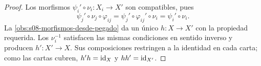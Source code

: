 \begin{center}
\begin{minipage}{.43\textwidth}
\centering
{}
\par{}
\end{minipage}\hfill
\begin{minipage}{.53\textwidth}
\centering
{}
\par{}
\end{minipage}
\end{center}
\begin{proof}
Los morfismos $\psi_i'\circ\nu_i\colon X_i\to X'$ son compatibles, pues
\[
\psi_j'\circ\nu_j\circ\varphi_{ij}
=\psi_j'\circ\varphi_{ij}'\circ\nu_i
=\psi_i'\circ\nu_i.
\]
La \cref{obs:s08-morfismos-desde-pegado} da un único $h\colon X\to X'$ con la propiedad requerida. Los $\nu_i^{-1}$ satisfacen las mismas condiciones en sentido inverso y producen $h'\colon X'\to X$. Sus composiciones restringen a la identidad en cada carta; como las cartas cubren, $h'h=\operatorname{id}_X$ y $hh'=\operatorname{id}_{X'}$.
\end{proof}

